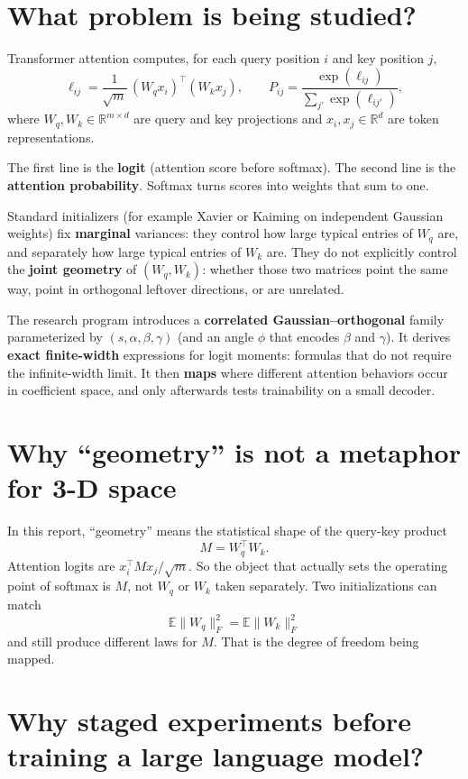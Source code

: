 \documentclass[11pt,a4paper]{report}
\begin{document}
\section{What problem is being studied?}

Transformer attention computes, for each query position $i$ and key position $j$,
\[
\ell_{ij} = \frac{1}{\sqrt{m}}\,(W_q x_i)^\top (W_k x_j),
\qquad
P_{ij} = \frac{\exp(\ell_{ij})}{\sum_{j'} \exp(\ell_{ij'})},
\]
where $W_q,W_k\in\mathbb{R}^{m\times d}$ are query and key projections and $x_i,x_j\in\mathbb{R}^d$ are token representations.

The first line is the \textbf{logit} (attention score before softmax). The second line is the \textbf{attention probability}. Softmax turns scores into weights that sum to one.

Standard initializers (for example Xavier or Kaiming on independent Gaussian weights) fix \textbf{marginal} variances: they control how large typical entries of $W_q$ are, and separately how large typical entries of $W_k$ are. They do not explicitly control the \textbf{joint geometry} of $(W_q,W_k)$: whether those two matrices point the same way, point in orthogonal leftover directions, or are unrelated.

The research program introduces a \textbf{correlated Gaussian--orthogonal} family parameterized by $(s,\alpha,\beta,\gamma)$ (and an angle $\phi$ that encodes $\beta$ and $\gamma$). It derives \textbf{exact finite-width} expressions for logit moments: formulas that do not require the infinite-width limit. It then \textbf{maps} where different attention behaviors occur in coefficient space, and only afterwards tests trainability on a small decoder.

\section{Why ``geometry'' is not a metaphor for 3-D space}

In this report, ``geometry'' means the statistical shape of the query-key product
\[
M = W_q^\top W_k.
\]
Attention logits are $x_i^\top M x_j / \sqrt{m}$. So the object that actually sets the operating point of softmax is $M$, not $W_q$ or $W_k$ taken separately. Two initializations can match
\[
\mathbb{E}\|W_q\|_F^2 = \mathbb{E}\|W_k\|_F^2
\]
and still produce different laws for $M$. That is the degree of freedom being mapped.

\section{Why staged experiments before training a large language model?}
\end{document}
